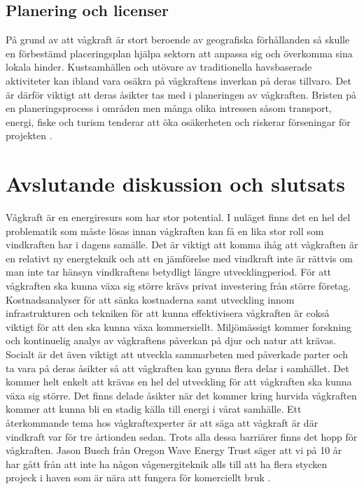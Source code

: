 \documentclass[10pt,a4paper,oneside]{article}
\begin{document}
\subsection{Planering och licenser}
På grund av att vågkraft är stort beroende av geografiska förhållanden så skulle en förbestämd placeringsplan hjälpa sektorn att anpassa sig och överkomma sina lokala hinder. Kustsamhällen och utövare av traditionella havsbaserade aktiviteter kan ibland vara osäkra på vågkraftens inverkan på deras tillvaro. Det är därför viktigt att deras åsikter tas med i planeringen av vågkraften. Bristen på en planeringsprocess i områden men många olika intressen såsom transport, energi, fiske och turism tenderar att öka osäkerheten och riskerar förseningar för projekten \cite{IRENA}. 


\section{Avslutande diskussion och slutsats}
Vågkraft är en energiresurs som har stor potential. I nuläget finns det en hel del problematik som måste lösas innan vågkraften kan få en lika stor roll som vindkraften har i dagens samälle. 
Det är viktigt att komma ihåg att vågkraften är en relativt ny energteknik och att en jämförelse med vindkraft inte är rättvis om man inte tar hänsyn vindkraftens betydligt längre utvecklingperiod. För att vågkraften ska kunna växa sig större krävs privat investering från större företag. Kostnadsanalyser för att sänka kostnaderna samt utveckling innom infrastrukturen och tekniken för att kunna effektivisera vågkraften är cokså viktigt för att den ska kunna växa kommersiellt. Miljömässigt kommer forskning och kontinuelig analys av vågkraftens påverkan på djur och natur att krävas. Socialt är det även viktigt att utveckla sammarbeten med påverkade parter och ta vara på deras åsikter så att vågkraften kan gynna flera delar i samhället. Det kommer helt enkelt att krävas en hel del utveckling för att vågkraften ska kunna växa sig större. Det finns delade åsikter när det kommer kring hurvida vågkraften kommer att kunna bli en stadig källa till energi i vårat samhälle. Ett återkommande tema hos vågkraftexperter är att säga att vågkraft är där vindkraft var för tre årtionden sedan. Trots alla dessa barriärer finns det hopp för vågkraften. Jason Busch från Oregon Wave Energy Trust säger att vi på 10 år har gått från att inte ha någon vågenergiteknik alls till att ha flera stycken projeck i haven som är nära att fungera för komerciellt bruk \cite{IRENA}.
\newpage
\end{document}
